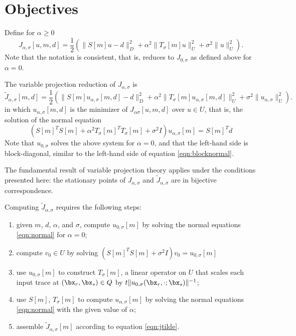 \section{Objectives}
Define for $\alpha \ge 0$
\[
 J_{\alpha,\sigma}[u,m,d] = \frac{1}{2}(\|S[m]u - d\|_D^2 + \alpha^2\|T_\sigma[m]u\|_U^2 + \sigma^2 \|u\|^2_U).
\]
Note that the notation is consistent, that is, reduces to $J_{0,\sigma}$ as defined above for $\alpha=0$.

The variable projection reduction of $J_{\alpha,\sigma}$ is
\begin{equation}
  \label{eqn:jtilde}
 \tilde{J}_{\alpha,\sigma}[m,d] = \frac{1}{2}(\|S[m]u_{\alpha,\sigma}[m,d] - d\|_D^2 + \alpha^2\|T_{\sigma}[m]u_{\alpha,\sigma}[m,d]\|_U^2 + \sigma^2 \|u_{\alpha,\sigma}\|^2_U).
\end{equation}
in which $u_{\alpha,\sigma}[m,d]$ is the minimizer of $J_{\alpha\sigma}[u,m,d]$ over $u \in U$, that is, the solution of the normal equation
\begin{equation}
  \label{eqn:normal}
  (S[m]^TS[m] + \alpha^2T_{\sigma}[m]^TT_{\sigma}[m] + \sigma^2I)u_{\alpha,\sigma}[m] = S[m]^Td
\end{equation}
Note that $u_{0,\sigma}$ solves the above system for $\alpha=0$, and that the left-hand side is block-diagonal, similar to the left-hand side of equation \ref{eqn:blocknormal}.

The fundamental result of variable projection theory \cite[]{GolubPereyra:73} applies under the conditions presented here: the stationary points of $J_{\alpha,\sigma}$ and $\tilde{J}_{\alpha,\sigma}$ are in bijective correspondence.

Computing $\tilde{J}_{\alpha,\sigma}$ requires the following steps:
\begin{enumerate}
\item given $m$, $d$, $\alpha$, and $\sigma$, compute $u_{0,\sigma}[m]$ by solving the normal equations \ref{eqn:normal} for $\alpha=0$;
\item compute $v_0 \in U$ by solving $(S[m]^TS[m] + \sigma^2 I)v_0 = u_{0,\sigma}[m]$
\item use $u_{0,\sigma}[m]$ to construct $T_{\sigma}[m]$, a linear operator on $U$  that scales each input trace at $(\bx_r,\bx_s) \in Q$  by $t\|u_{0,\sigma}(\bx_r,\cdot;\bx_s)\|^{-1}$;
\item use $S[m]$, $T_{\sigma}[m]$ to compute $u_{\alpha,\sigma}[m]$ by solving the normal equations \ref{eqn:normal} with the given value of $\alpha$;
\item assemble $\tilde{J}_{\alpha,\sigma}[m]$ according to equation \ref{eqn:jtilde}.
\end{enumerate}

